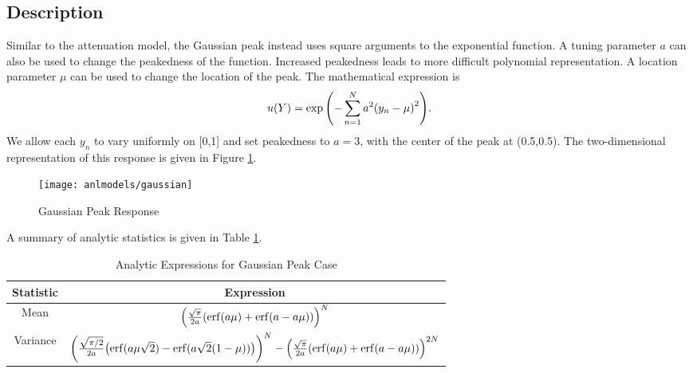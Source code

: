 \subsection{Description}\label{mod:gausspeak}
Similar to the attenuation model, the Gaussian peak \cite{sfugenz} instead uses square arguments to the
exponential function.  A tuning parameter $a$ can also be used to change the peakedness of the
function.  Increased peakedness leads to more difficult polynomial representation.
A location parameter $\mu$ can be used to change the location of the peak.
The mathematical expression is
\begin{equation}
  u(Y) = \exp\qty(-\sum_{n=1}^N a^2\qty(y_n-\mu)^2).
\end{equation}
We allow each $y_n$ to vary uniformly on [0,1] and set peakedness to $a=3$, with the center
of the peak at (0.5,0.5).
The two-dimensional representation of this response is given in Figure \ref{fig: gauss peak}.
\begin{figure}[htb]
  \centering
  \texttt{[image: anlmodels/gaussian]}
  \caption{Gaussian Peak Response \cite{sfu}}
  \label{fig: gauss peak}
\end{figure}
A summary of analytic statistics is given in Table \ref{tab:gausspeak moments}.

\begin{table}[H]
  \centering
  \begin{tabular}{c|c}
    Statistic & Expression \\ \hline
    Mean & $\qty(\frac{\sqrt{\pi}}{2a}\qty(\erf(a\mu)+\erf(a-a\mu)))^N$ \\
    Variance & $\qty(\frac{\sqrt{\pi/2}}{2a}\qty(\erf(a\mu\sqrt{2})-\erf(a\sqrt{2}(1-\mu))))^N - 
        \qty(\frac{\sqrt{\pi}}{2a}\qty(\erf(a\mu)+\erf(a-a\mu)))^{2N}$
  \end{tabular}
  \caption{Analytic Expressions for Gaussian Peak Case}
  \label{tab:gausspeak moments}
\end{table}
